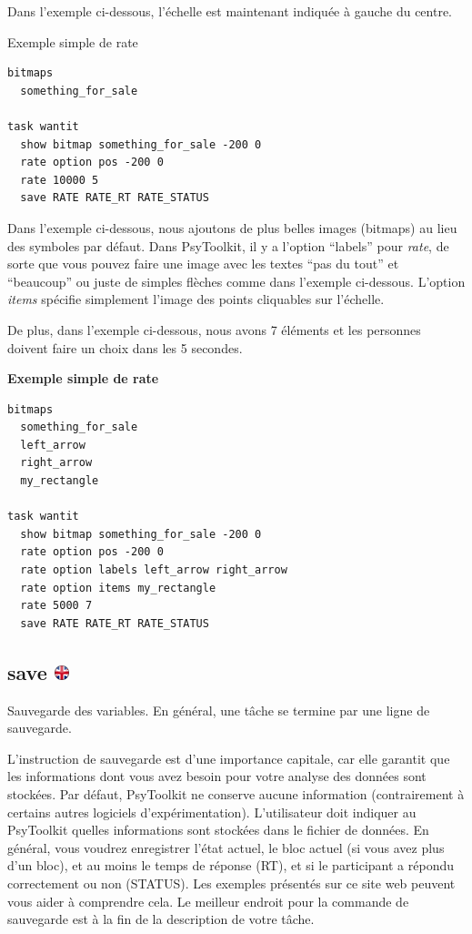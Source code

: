 \documentclass[
]{book}
\begin{document}
Dans l'exemple ci-dessous, l'échelle est maintenant indiquée à gauche du centre.

Exemple simple de rate

\begin{verbatim}
bitmaps
  something_for_sale

task wantit
  show bitmap something_for_sale -200 0
  rate option pos -200 0
  rate 10000 5
  save RATE RATE_RT RATE_STATUS
\end{verbatim}

Dans l'exemple ci-dessous, nous ajoutons de plus belles images (bitmaps) au lieu des symboles par défaut. Dans PsyToolkit, il y a l'option ``labels'' pour \emph{rate}, de sorte que vous pouvez faire une image avec les textes ``pas du tout'' et ``beaucoup'' ou juste de simples flèches comme dans l'exemple ci-dessous. L'option \emph{items} spécifie simplement l'image des points cliquables sur l'échelle.

De plus, dans l'exemple ci-dessous, nous avons 7 éléments et les personnes doivent faire un choix dans les 5 secondes.

\textbf{Exemple simple de rate}

\begin{verbatim}
bitmaps
  something_for_sale
  left_arrow
  right_arrow
  my_rectangle

task wantit
  show bitmap something_for_sale -200 0
  rate option pos -200 0
  rate option labels left_arrow right_arrow
  rate option items my_rectangle
  rate 5000 7
  save RATE RATE_RT RATE_STATUS
\end{verbatim}

\hypertarget{save}{%
\subsection[save ]{\texorpdfstring{save \href{https://www.psytoolkit.org/doc3.4.0/syntax.html\#task-save}{\protect\includegraphics{img/ukflag.png}}}{save }}\label{save}}

Sauvegarde des variables. En général, une tâche se termine par une ligne de sauvegarde.

L'instruction de sauvegarde est d'une importance capitale, car elle garantit que les informations dont vous avez besoin pour votre analyse des données sont stockées. Par défaut, PsyToolkit ne conserve aucune information (contrairement à certains autres logiciels d'expérimentation). L'utilisateur doit indiquer au PsyToolkit quelles informations sont stockées dans le fichier de données.
En général, vous voudrez enregistrer l'état actuel, le bloc actuel (si vous avez plus d'un bloc), et au moins le temps de réponse (RT), et si le participant a répondu correctement ou non (STATUS). Les exemples présentés sur ce site web peuvent vous aider à comprendre cela.
Le meilleur endroit pour la commande de sauvegarde est à la fin de la description de votre tâche.
\end{document}
